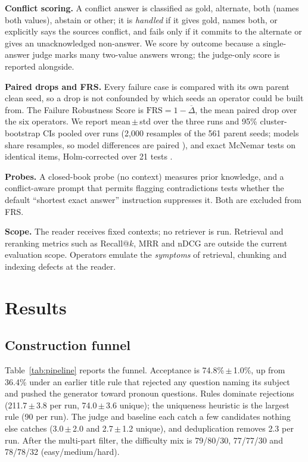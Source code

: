\documentclass[conference]{IEEEtran}
\begin{document}
\textbf{Conflict scoring.} A conflict answer is classified as gold, alternate, both (names both
values), abstain or other; it is \emph{handled} if it gives gold, names both, or explicitly says
the sources conflict, and fails only if it commits to the alternate or gives an unacknowledged
non-answer. We score by outcome because a single-answer judge marks many two-value answers
wrong; the judge-only score is reported alongside.

\textbf{Paired drops and FRS.} Every failure case is compared with its own parent clean seed, so
a drop is not confounded by which seeds an operator could be built from. The Failure Robustness
Score is $\mathrm{FRS} = 1 - \overline{\Delta}$, the mean paired drop over the six operators. We
report mean\,$\pm$\,std over the three runs and 95\% cluster-bootstrap CIs pooled over runs
(2,000 resamples of the 561 parent seeds; models share resamples, so model differences are
paired \cite{efron1993bootstrap}), and exact McNemar tests on identical items, Holm-corrected
over 21 tests \cite{mcnemar1947,holm1979}.

\textbf{Probes.} A closed-book probe (no context) measures prior knowledge, and a conflict-aware
prompt that permits flagging contradictions tests whether the default ``shortest exact answer''
instruction suppresses it. Both are excluded from FRS.

\textbf{Scope.}
\label{sec:scope}
The reader receives fixed contexts; no retriever is run. Retrieval and reranking metrics such as
Recall@$k$, MRR and nDCG are outside the current evaluation scope. Operators emulate the
\emph{symptoms} of retrieval, chunking and indexing defects at the reader.

\section{Results}
\subsection{Construction funnel}
Table~\ref{tab:pipeline} reports the funnel. Acceptance is 74.8\%\,$\pm$\,1.0\%, up from 36.4\%
under an earlier title rule that rejected any question naming its subject and pushed the
generator toward pronoun questions. Rules dominate rejections (211.7\,$\pm$\,3.8 per run,
74.0\,$\pm$\,3.6 unique); the uniqueness heuristic is the largest rule (90 per run). The judge and
baseline each catch a few candidates nothing else catches (3.0\,$\pm$\,2.0 and 2.7\,$\pm$\,1.2
unique), and deduplication removes 2.3 per run. After the multi-part filter, the difficulty mix
is 79/80/30, 77/77/30 and 78/78/32 (easy/medium/hard).
\end{document}
